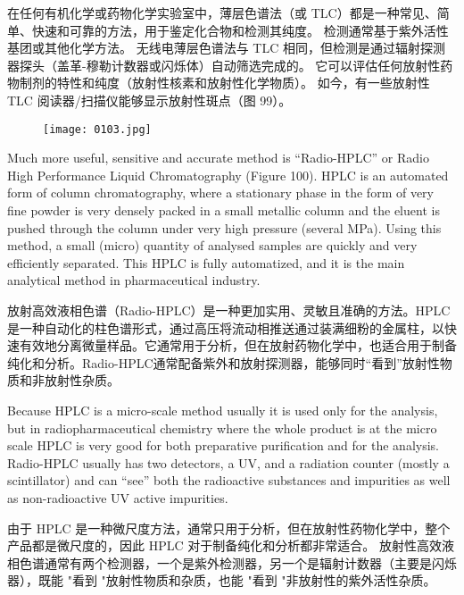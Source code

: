 \documentclass[dvipsnames, svgnames,a4paper,11pt]{article}
\begin{document}
在任何有机化学或药物化学实验室中，薄层色谱法（或 TLC）都是一种常见、简单、快速和可靠的方法，用于鉴定化合物和检测其纯度。 检测通常基于紫外活性基团或其他化学方法。 无线电薄层色谱法与 TLC 相同，但检测是通过辐射探测器探头（盖革-穆勒计数器或闪烁体）自动筛选完成的。 它可以评估任何放射性药物制剂的特性和纯度（放射性核素和放射性化学物质）。 如今，有一些放射性 TLC 阅读器/扫描仪能够显示放射性斑点（图 99）。

\begin{figure}[h]
    \centering
    \texttt{[image: 0103.jpg]}
     \label{fig99}
\end{figure}


Much more useful, sensitive and accurate method is “Radio-HPLC” or Radio High
Performance Liquid Chromatography (Figure 100). HPLC is an automated form of
column chromatography, where a stationary phase in the form of very fine powder is
very densely packed in a small metallic column and the eluent is pushed through the
column under very high pressure (several MPa). Using this method, a small (micro)
quantity of analysed samples are quickly and very efficiently separated. This HPLC
is fully automatized, and it is the main analytical method in pharmaceutical industry.


放射高效液相色谱（Radio-HPLC）是一种更加实用、灵敏且准确的方法。HPLC是一种自动化的柱色谱形式，通过高压将流动相推送通过装满细粉的金属柱，以快速有效地分离微量样品。它通常用于分析，但在放射药物化学中，也适合用于制备纯化和分析。Radio-HPLC通常配备紫外和放射探测器，能够同时“看到”放射性物质和非放射性杂质。




Because HPLC is a micro-scale method usually it is used only for the analysis, but in
radiopharmaceutical chemistry where the whole product is at the micro scale HPLC
is very good for both preparative purification and for the analysis. Radio-HPLC
usually has two detectors, a UV, and a radiation counter (mostly a scintillator) and
can “see” both the radioactive substances and impurities as well as non-radioactive
UV active impurities.

由于 HPLC 是一种微尺度方法，通常只用于分析，但在放射性药物化学中，整个产品都是微尺度的，因此 HPLC 对于制备纯化和分析都非常适合。 放射性高效液相色谱通常有两个检测器，一个是紫外检测器，另一个是辐射计数器（主要是闪烁器），既能 "看到 "放射性物质和杂质，也能 "看到 "非放射性的紫外活性杂质。
\end{document}
